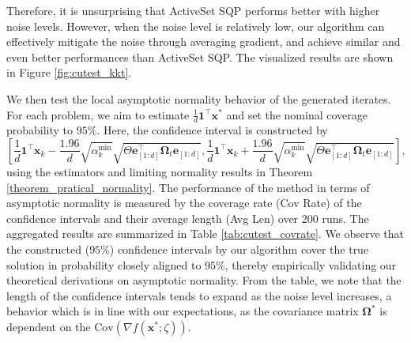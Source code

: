 \documentclass[aos]{imsart}
\numberwithin{equation}{section}
\theoremstyle{plain}
\begin{document}
Therefore, it is unsurprising that ActiveSet SQP performs better with higher noise levels. However, when the noise level is relatively low, our algorithm can effectively mitigate the noise through averaging gradient, and achieve similar and even better performances than ActiveSet SQP. The visualized results are shown in Figure \ref{fig:cutest_kkt}.


We then test the local asymptotic normality behavior of the generated iterates. For each problem, we aim to estimate $\frac{1}{d}\bm{1}^{\top} \bm{x}^{*}$ and set the nominal coverage probability to $95\%$. Here, the confidence interval is constructed by $$\left[\frac{1}{d}\bm{1}^{\top} \bm{x}_{k} - \frac{1.96}{d}\sqrt{\alpha_k^{\min}}  \sqrt{\Theta \bm{e}_{[1:d]} ^{\top} \bm{\Omega}_{t} \bm{e}_{[1:d]} }, \frac{1}{d}\bm{1}^{\top} \bm{x}_{k} + \frac{1.96}{d}\sqrt{ \alpha_k^{\min}}  \sqrt{\Theta \bm{e}_{[1:d]}^{\top} \bm{\Omega}_{t} \bm{e}_{[1:d]} } \right],$$
using the estimators and limiting normality results in Theorem \ref{theorem_pratical_normality}. The performance of the method in terms of asymptotic normality is measured by the coverage rate (Cov Rate) of the confidence intervals and their average length (Avg Len) over 200 runs. The aggregated results are summarized in Table \ref{tab:cutest_covrate}. We observe that the constructed ($95\%$) confidence intervals by our algorithm cover the true solution in probability closely aligned to $95\%$, thereby empirically validating our theoretical derivations on asymptotic normality. 
From the table, we note that the length of the confidence intervals tends to expand as the noise level increases, a behavior which is in line with our expectations, as the covariance matrix $\bm{\Omega}^{*}$ is dependent on the $\text{Cov}\left( \nabla f(\bm{x}^{*};\zeta)\right)$. 
\end{document}
